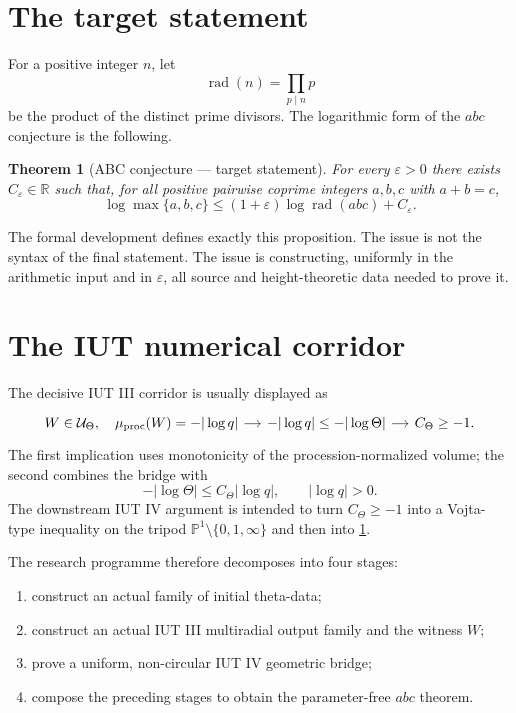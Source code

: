 \documentclass[11pt]{amsart}
\newtheorem{theorem}{Theorem}[section]
\theoremstyle{definition}
\theoremstyle{remark}
\newcommand{\R}{\mathbb R}
\newcommand{\PP}{\mathbb P}
\newcommand{\UTheta}{\mathcal U_\Theta}
\newcommand{\mup}{\mu_{\mathrm{proc}}}
\newcommand{\rad}{\operatorname{rad}}
\newcommand{\eps}{\varepsilon}
\begin{document}
\tableofcontents

\section{The target statement}

For a positive integer $n$, let
\[
 \rad(n)=\prod_{p\mid n}p
\]
be the product of the distinct prime divisors.  The logarithmic form of the
$abc$ conjecture is the following.

\begin{theorem}[ABC conjecture --- target statement]\label{thm:abc-target}
For every $\eps>0$ there exists $C_\eps\in\R$ such that, for all positive
pairwise coprime integers $a,b,c$ with $a+b=c$,
\[
 \log\max\{a,b,c\}
 \le
 (1+\eps)\log\rad(abc)+C_\eps.
\]
\end{theorem}

The formal development defines exactly this proposition.  The issue is not the
syntax of the final statement.  The issue is constructing, uniformly in the
arithmetic input and in $\eps$, all source and height-theoretic data needed to
prove it.

\section{The IUT numerical corridor}

The decisive IUT III corridor is usually displayed as
\[
\begin{tikzcd}[column sep=small]
W\in\UTheta,\quad \mup(W)=-|\log q|
\arrow[r]
&
-|\log q|\le-|\log\Theta|
\arrow[r]
&
C_\Theta\ge-1.
\end{tikzcd}
\]
The first implication uses monotonicity of the procession-normalized volume;
the second combines the bridge with
\[
 -|\log\Theta|\le C_\Theta|\log q|,
 \qquad |\log q|>0.
\]
The downstream IUT IV argument is intended to turn $C_\Theta\ge-1$ into a
Vojta-type inequality on the tripod
$\PP^1\setminus\{0,1,\infty\}$ and then into \cref{thm:abc-target}.

The research programme therefore decomposes into four stages:

\begin{enumerate}[label=(\arabic*)]
\item construct an actual family of initial theta-data;
\item construct an actual IUT III multiradial output family and the witness
$W$;
\item prove a uniform, non-circular IUT IV geometric bridge;
\item compose the preceding stages to obtain the parameter-free $abc$
theorem.
\end{enumerate}
\end{document}
